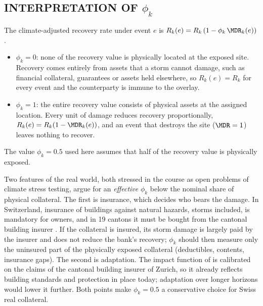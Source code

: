 \subsection{INTERPRETATION OF $\phi_k$}
\label{subsec:phi}
The climate-adjusted recovery rate under event $e$ is $R_k(e)=R_k\,(1-\phi_k\,\MDR_k(e))$.
\begin{itemize}
\item $\phi_k=0$: none of the recovery value is physically located at the exposed site. Recovery comes entirely from assets that a storm cannot damage, such as financial collateral, guarantees or assets held elsewhere, so $R_k(e)=R_k$ for every event and the counterparty is immune to the overlay.
\item $\phi_k=1$: the entire recovery value consists of physical assets at the assigned location. Every unit of damage reduces recovery proportionally, $R_k(e)=R_k(1-\MDR_k(e))$, and an event that destroys the site ($\MDR=1$) leaves nothing to recover.
\end{itemize}
The value $\phi_k=0.5$ used here assumes that half of the recovery value is physically exposed.

Two features of the real world, both stressed in the course as open problems of climate stress testing, argue for an \emph{effective} $\phi_k$ below the nominal share of physical collateral. The first is insurance, which decides who bears the damage. In Switzerland, insurance of buildings against natural hazards, storms included, is mandatory for owners, and in 19 cantons it must be bought from the cantonal building insurer \citep{BAFU20}. If the collateral is insured, its storm damage is largely paid by the insurer and does not reduce the bank's recovery; $\phi_k$ should then measure only the uninsured part of the physically exposed collateral (deductibles, contents, insurance gaps). The second is adaptation. The impact function of \citet{Welker21} is calibrated on the claims of the cantonal building insurer of Zurich, so it already reflects building standards and protection in place today; adaptation over longer horizons would lower it further. Both points make $\phi_k=0.5$ a conservative choice for Swiss real collateral.

